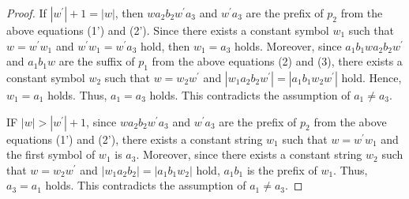 \begin{proof}
\noindent
If $|w^{\prime}|+1=|w|$, then $wa_{2}b_{2}w^{\prime}a_{3}$ and $w^{\prime}a_{3}$ are the prefix of $p_{2}$ from the above equations (1') and (2').
Since there exists a constant symbol $w_{1}$ such that $w=w^{\prime}w_{1}$ and $w^{\prime}w_{1}=w^{\prime}a_{3}$ hold, then $w_{1}=a_{3}$ holds.
Moreover, since $a_{1}b_{1}wa_{2}b_{2}w^{\prime}$ and $a_{1}b_{1}w$ are the suffix of $p_{1}$ from the above equations (2) and (3), 
there exists a constant symbol $w_{2}$ such that $w=w_{2}w^{\prime}$ and $|w_{1}a_{2}b_{2}w^{\prime}|=|a_{1}b_{1}w_{2}w^{\prime}|$ hold.
Hence, $w_{1}=a_{1}$ holds.
Thus, $a_{1}=a_{3}$ holds.
This contradicts the assumption of $a_{1}\ne a_{3}$.

\noindent
IF $|w| > |w^{\prime}|+1$, since $wa_{2}b_{2}w^{\prime}a_{3}$ and $w^{\prime}a_{3}$ are the prefix of $p_{2}$ from the above equations (1') and (2'),
there exists a constant string $w_{1}$ such that $w=w^{\prime}w_{1}$ and the first symbol of $w_{1}$ is $a_{3}$.
Moreover, since there exists a constant string $w_{2}$ such that $w=w_{2}w^{\prime}$ and $|w_{1}a_{2}b_{2}|=|a_{1}b_{1}w_{2}|$ hold,
$a_{1}b_{1}$ is the prefix of $w_{1}$.
Thus, $a_{3}=a_{1}$ holds.
This contradicts the assumption of $a_{1} \ne a_{3}$.
\smallskip


\end{proof}
